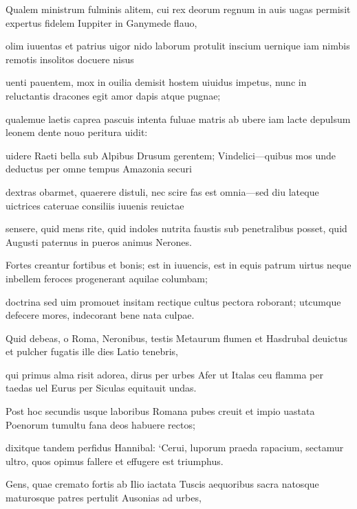\documentclass{book}
\newenvironment {carmen} [1] [\relax] 
  {\Titulus \Versus \incipit*\numerus{1}#1}
  {\endVersus}
\newcommand {\Alcaic}    {\Forma \strophae {0 \poena 01 \poena 2}}
\begin{document}
\begin{carmen}[\Alcaic]


Qualem ministrum fulminis alitem,
 cui rex deorum regnum in auis uagas
      permisit expertus fidelem
      Iuppiter in Ganymede flauo,
 
olim iuuentas et patrius uigor               
 nido laborum protulit inscium
      uernique iam nimbis remotis
      insolitos docuere nisus
 
uenti pauentem, mox in ouilia
 demisit hostem uiuidus impetus,               
      nunc in reluctantis dracones
      egit amor dapis atque pugnae;
 
qualemue laetis caprea pascuis
 intenta fuluae matris ab ubere
      iam lacte depulsum leonem
      dente nouo peritura uidit:
 
uidere Raeti bella sub Alpibus
 Drusum gerentem; Vindelici---quibus
      mos unde deductus per omne
      tempus Amazonia securi               
 
dextras obarmet, quaerere distuli,
 nec scire fas est omnia---sed diu
      lateque uictrices cateruae
      consiliis iuuenis reuictae
 
sensere, quid mens rite, quid indoles               
 nutrita faustis sub penetralibus
      posset, quid Augusti paternus
      in pueros animus Nerones.
 
Fortes creantur fortibus et bonis;
 est in iuuencis, est in equis patrum               
      uirtus neque inbellem feroces
      progenerant aquilae columbam;
 
doctrina sed uim promouet insitam
 rectique cultus pectora roborant;
      utcumque defecere mores,               
      indecorant bene nata culpae.
 
Quid debeas, o Roma, Neronibus,
 testis Metaurum flumen et Hasdrubal
      deuictus et pulcher fugatis
      ille dies Latio tenebris,               
 
qui primus alma risit adorea,
 dirus per urbes Afer ut Italas
      ceu flamma per taedas uel Eurus
      per Siculas equitauit undas.
 
Post hoc secundis usque laboribus                
Romana pubes creuit et impio
      uastata Poenorum tumultu
      fana deos habuere rectos;
 
dixitque tandem perfidus Hannibal:
 `Cerui, luporum praeda rapacium,               
      sectamur ultro, quos opimus
      fallere et effugere est triumphus.
 
Gens, quae cremato fortis ab Ilio
 iactata Tuscis aequoribus sacra
      natosque maturosque patres               
      pertulit Ausonias ad urbes,
 

\end{carmen}
\end{document}
